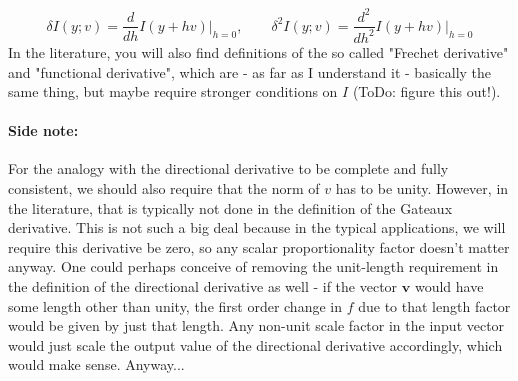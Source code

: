 \begin{equation}
 \delta   I(y; v) = \frac{d}  {d h  } I(y + h v) \bigg\rvert_{h=0}, \qquad
 \delta^2 I(y; v) = \frac{d^2}{d h^2} I(y + h v) \bigg\rvert_{h=0}
\end{equation}
In the literature, you will also find definitions of the so called "Frechet derivative" and "functional derivative", which are - as far as I understand it - basically the same thing, but maybe require stronger conditions on $I$ (ToDo: figure this out!).





\paragraph{Side note:} For the analogy with the directional derivative to be complete and fully consistent, we should also require that the norm of $v$ has to be unity. However, in the literature, that is typically not done in the definition of the Gateaux derivative. This is not such a big deal because in the typical applications, we will require this derivative be zero, so any scalar proportionality factor doesn't matter anyway. One could perhaps conceive of removing the unit-length requirement in the definition of the directional derivative as well - if the vector $\mathbf{v}$ would have some length other than unity, the first order change in $f$ due to that length factor would be given by just that length. Any non-unit scale factor in the input vector would just scale the output value of the directional derivative accordingly, which would make sense. Anyway...


